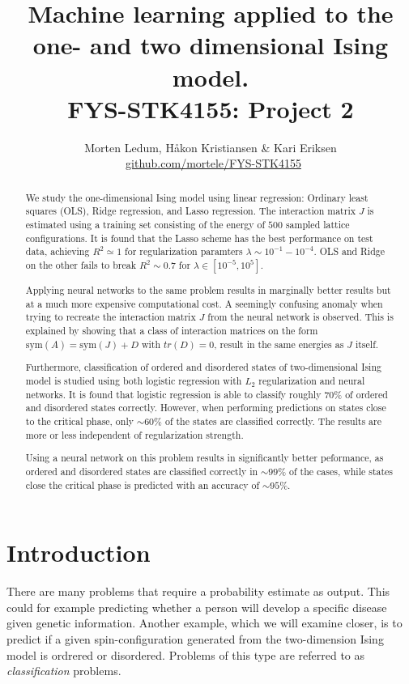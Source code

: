 \documentclass[a4paper, twocolumn]{article}
\title{{\sc Machine learning applied to the one- and two dimensional Ising model. \\ {\large FYS-STK4155: Project 2}}}
\author{Morten Ledum, Håkon Kristiansen \& Kari Eriksen \\ \faGithub \ {\small \href{https://github.com/mortele/FYS-STK4155/tree/master/project2}{github.com/mortele/FYS-STK4155}}}
\begin{document}
\onecolumn
\maketitle

\begin{abstract}
We study the one-dimensional Ising model using linear regression: Ordinary
least squares (OLS), Ridge regression, and Lasso regression. The interaction matrix $J$ is estimated using a training set 
consisting of the energy of $500$ sampled lattice configurations. It is found that the Lasso scheme has the best performance 
on test data, achieving $R^2 \simeq 1$ for regularization paramters $\lambda \sim 10^{-1} - 10^{-4}$. OLS and Ridge on the other fails 
to break $R^2 \sim 0.7$ for $\lambda \in [10^{-5}, 10^{5}]$. 

Applying neural networks to the same problem results in marginally 
better results but at a much more expensive computational cost. A seemingly confusing anomaly when trying to recreate the interaction 
matrix $J$ from the neural network is observed. This is explained by showing that a class of interaction matrices on the 
form $\text{sym}(A) = \text{sym}(J) + D$ with $tr(D) = 0$, result in the same energies as $J$ itself.

Furthermore, classification of ordered and disordered states of two-dimensional Ising model is studied using both 
logistic regression with $L_2$ regularization and neural networks. It is found that logistic regression is able to classify 
roughly $70$\% of ordered and disordered states correctly. However, when performing predictions on states close to the critical phase, only $\sim 60$\% of 
the states are classified correctly. The results are more or less independent of regularization strength. 

Using a neural network on this problem results in significantly better peformance, as ordered and disordered states 
are classified correctly in $\sim 99$\% of the cases, while states close the critical phase is predicted with an accuracy of $\sim 95$\%.
\end{abstract}

\twocolumn
\onecolumn

\tableofcontents 

\twocolumn


\section{Introduction}
There are many problems that require a probability estimate as output. This could for example predicting whether a person will develop a specific disease given genetic information. Another example, which we will examine closer, is to predict if a given spin-configuration generated from the two-dimension Ising model is ordrered or disordered. Problems of this type are referred to as \textit{classification} problems. 
\end{document}
